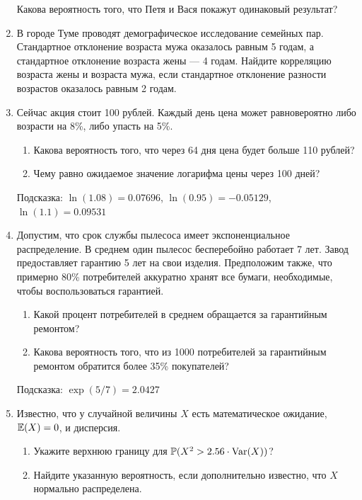 \begin{enumerate}
Какова вероятность того, что Петя и Вася покажут одинаковый результат?

\item В городе Туме проводят демографическое исследование семейных пар. Стандартное
отклонение возраста мужа оказалось равным 5 годам, а стандартное отклонение возраста
жены — 4 годам. Найдите корреляцию возраста жены и возраста мужа, если стандартное
отклонение разности возрастов оказалось равным 2 годам.

\item Сейчас акция стоит 100 рублей. Каждый день цена может равновероятно либо
возрасти на 8\%, либо упасть на 5\%.
\begin{enumerate}
\item Какова вероятность того, что через 64 дня цена будет больше 110 рублей?
\item Чему равно ожидаемое значение логарифма цены через 100 дней?
\end{enumerate}
Подсказка: $\ln(1.08)=0.07696$, $\ln(0.95)=-0.05129$, $\ln(1.1)=0.09531$

\item Допустим, что срок службы пылесоса имеет экспоненциальное распределение.
В среднем один пылесос бесперебойно работает 7 лет. Завод предоставляет гарантию
5 лет на свои изделия. Предположим также, что примерно 80\% потребителей аккуратно
хранят все бумаги, необходимые, чтобы воспользоваться гарантией.
\begin{enumerate}
\item Какой процент потребителей в среднем обращается за гарантийным ремонтом?
\item Какова вероятность того, что из 1000 потребителей за гарантийным ремонтом
обратится более 35\% покупателей?
\end{enumerate}
Подсказка: $\exp(5/7)=2.0427$

\item Известно, что у случайной величины $X$ есть математическое ожидание, $\operatorname{\mathbb{E}}(X)=0$,
и дисперсия.
\begin{enumerate}
\item Укажите верхнюю границу для $\operatorname{\mathbb{P}}(X^{2}>2.56\cdot \operatorname{Var}(X))$? %
\item Найдите указанную вероятность, если дополнительно известно, что
$X$ нормально распределена. %
\end{enumerate}
\end{enumerate}

